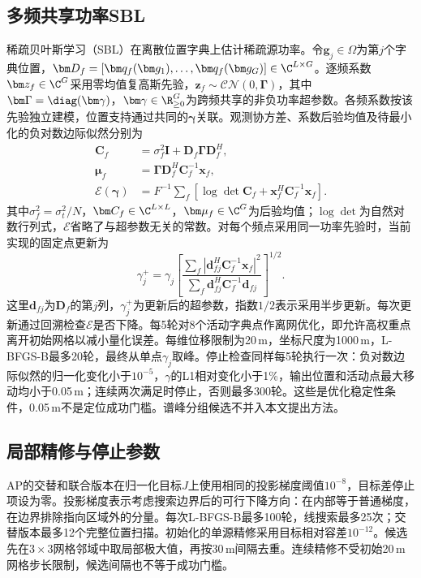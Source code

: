 \subsection{多频共享功率SBL}
稀疏贝叶斯学习（SBL）在离散位置字典上估计稀疏源功率。令$\bm g_j\in\Omega$为第$j$个字典位置，$\bm D_f=[\bm q_f(\bm g_1),\ldots,\bm q_f(\bm g_G)]\in\C^{L\times G}$。逐频系数$\bm z_f\in\C^G$采用零均值复高斯先验，$\bm z_f\sim\mathcal{CN}(0,\bm\Gamma)$，其中$\bm\Gamma=\diag(\bm\gamma)$，$\bm\gamma\in\R_{\ge0}^G$为跨频共享的非负功率超参数\cite{Nannuru2019}。各频系数按该先验独立建模，位置支持通过共同的$\bm\gamma$关联。观测协方差、系数后验均值及待最小化的负对数边际似然分别为
\begin{align}
 \bm C_f&=\sigma_f^2\bm I+\bm D_f\bm\Gamma\bm D_f^H,\label{eq:sblCov}\\
 \bm\mu_f&=\bm\Gamma\bm D_f^H\bm C_f^{-1}\bm x_f,\nonumber\\
 \mathcal E(\bm\gamma)&=F^{-1}\sum_f[\log\det\bm C_f+\bm x_f^H\bm C_f^{-1}\bm x_f] .\label{eq:sblEvidence}
\end{align}
其中$\sigma_f^2=\sigma_t^2/N$，$\bm C_f\in\C^{L\times L}$，$\bm\mu_f\in\C^G$为后验均值；$\log\det$为自然对数行列式，$\mathcal E$省略了与超参数无关的常数。对每个频点采用同一功率先验时，当前实现的固定点更新为
\begin{equation}
 \gamma_j^+=\gamma_j\left[
 \frac{\sum_f|\bm d_{fj}^H\bm C_f^{-1}\bm x_f|^2}
 {\sum_f\bm d_{fj}^H\bm C_f^{-1}\bm d_{fj}}
 \right]^{1/2} .\label{eq:sblUpdate}
\end{equation}
这里$\bm d_{fj}$为$\bm D_f$的第$j$列，$\gamma_j^+$为更新后的超参数，指数$1/2$表示采用半步更新。每次更新通过回溯检查$\mathcal E$是否下降。每5轮对8个活动字典点作离网优化，即允许高权重点离开初始网格以减小量化误差。每维位移限制为20\,m，坐标尺度为1000\,m，L-BFGS-B最多20轮，最终从单点$\gamma_j$取峰。停止检查同样每5轮执行一次：负对数边际似然的归一化变化小于$10^{-5}$，$\gamma$的L1相对变化小于1\%，输出位置和活动点最大移动均小于0.05\,m；连续两次满足时停止，否则最多300轮。这些是优化稳定性条件，0.05\,m不是定位成功门槛。谱峰分组候选不并入本文提出方法。

\subsection{局部精修与停止参数}
AP的交替和联合版本在归一化目标$J$上使用相同的投影梯度阈值$10^{-8}$，目标差停止项设为零。投影梯度表示考虑搜索边界后的可行下降方向：在内部等于普通梯度，在边界排除指向区域外的分量。每次L-BFGS-B最多100轮，线搜索最多25次；交替版本最多12个完整位置扫描。初始化的单源精修采用目标相对容差$10^{-12}$。候选先在$3\times3$网格邻域中取局部极大值，再按30\,m间隔去重。连续精修不受初始20\,m网格步长限制，候选间隔也不等于成功门槛。

